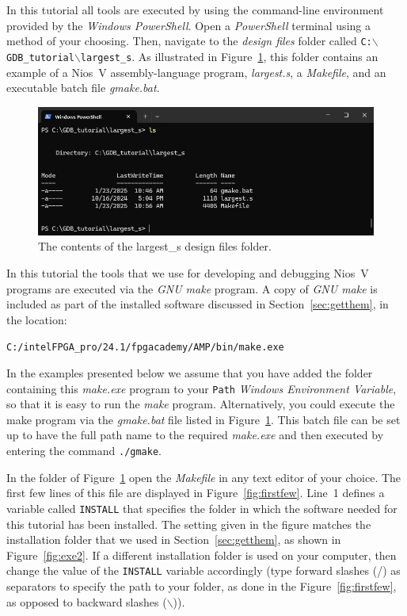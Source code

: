 \documentclass[11pt, twoside, pdftex]{article}
\begin{document}
In this tutorial all tools are executed by using the command-line environment 
provided by the {\it Windows PowerShell}.
Open a {\it PowerShell} terminal using a method of your choosing.  Then, navigate to the 
{\it design files} folder called \texttt{C:$\backslash$GDB\_tutorial$\backslash$largest\_s}. 
As illustrated in Figure~\ref{fig:largest1}, this folder contains an example of a 
Nios~V assembly-language program, {\it largest.s}, a {\it Makefile}, and an executable
batch file {\it gmake.bat}. 

\begin{figure}[h]
    \begin{center}
        \includegraphics[width=.9\linewidth]{figures/largest1_new.png}
        \caption{The contents of the largest\_s design files folder.}
        \label{fig:largest1}
    \end{center}
\end{figure}

In this tutorial the tools that we use for developing and debugging Nios~V programs are 
executed via the {\it GNU make} program. A copy of {\it GNU make} is included as part of
the installed software discussed in Section~\ref{sec:getthem}, in the location:

\texttt{C:/intelFPGA\_pro/24.1/fpgacademy/AMP/bin/make.exe}

In the examples presented below we assume that you have added the folder containing this 
{\it make.exe} program to your \texttt{Path} {\it Windows Environment Variable}, so that it is 
easy to run the {\it make} program. Alternatively, you could execute the make program via 
the {\it gmake.bat} file listed in Figure~\ref{fig:largest1}. This batch file can be set
up to have the full path name to the required {\it make.exe} and then executed by entering 
the command \texttt{./gmake}.

In the folder of Figure~\ref{fig:largest1} open the {\it Makefile} in any text editor of your
choice. The first few lines of this file are displayed in Figure~\ref{fig:firstfew}.
Line~1 defines a variable called \texttt{INSTALL} that specifies the folder in which the 
software needed for this tutorial has been installed. The setting given in the figure matches 
the installation folder that we used in Section~\ref{sec:getthem}, as shown in 
Figure~\ref{fig:exe2}. If a different installation folder is used on your computer, then 
change the value of the \texttt{INSTALL} variable accordingly (type forward slashes (/)
as separators to specify the path to your folder, as done in the Figure~\ref{fig:firstfew},
as opposed to backward slashes ($\backslash$)). 
\end{document}
